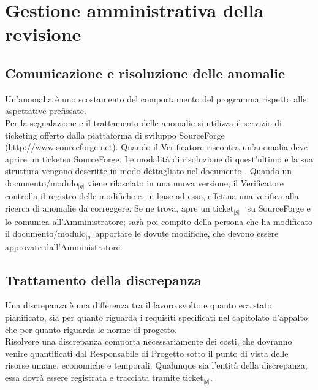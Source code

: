 
\section{Gestione amministrativa della revisione}{
    \subsection{Comunicazione e risoluzione delle anomalie}{
	Un’anomalia è uno scostamento del comportamento del programma rispetto alle aspettative prefissate.\\
	Per la segnalazione e il trattamento delle anomalie si utilizza il servizio di ticketing offerto dalla piattaforma di sviluppo 
	SourceForge (\url{http://www.sourceforge.net}). Quando il Verificatore riscontra un’anomalia deve aprire un ticket\g su SourceForge. 
	Le modalità di risoluzione di quest’ultimo e la sua struttura vengono descritte in modo dettagliato nel documento \emph{\NormeDiProgetto}.
	Quando un documento/modulo$_{|g|}$ viene rilasciato in una nuova versione, il Verificatore controlla il registro delle modifiche e, in base ad esso, 
	effettua una verifica alla ricerca di anomalie da correggere. Se ne trova, apre un ticket$_{|g|}$~ su SourceForge e lo comunica all’Amministratore; 
	sarà poi compito della persona che ha modificato il documento/modulo$_{|g|}$ apportare le dovute modifiche, che devono essere approvate dall’Amministratore. 
    }

    \subsection{Trattamento della discrepanza}{
      Una discrepanza è una differenza tra il lavoro svolto e quanto era stato pianificato, sia per quanto riguarda i requisiti specificati nel capitolato d’appalto 
      che per quanto riguarda le norme di progetto.\\
      Risolvere una discrepanza comporta necessariamente dei costi, che dovranno venire quantificati dal Responsabile di Progetto sotto il punto di vista delle risorse umane, 
      economiche e temporali.
      Qualunque sia l’entità della discrepanza, essa dovrà essere registrata e tracciata tramite ticket$_{|g|}$.
    }

}
